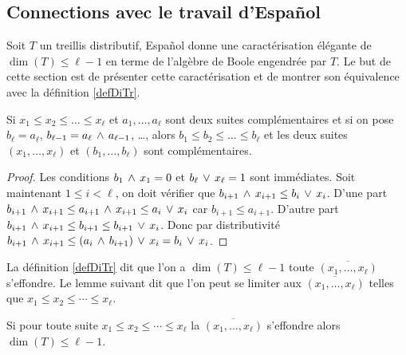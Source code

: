 \subsection{Connections avec le travail d'Espa\~nol}
\label{subsubsecEspanol}

 Soit $T$ un treillis distributif,
 Espa\~nol \cite{esp} donne une caractérisation élégante de
$\dim(T)\leq {\ell}-1$ en terme de l'algèbre de Boole
engendrée par $T$. Le but de cette section est de
présenter cette caractérisation et de montrer
son équivalence avec la définition \ref{defDiTr}.

\begin{lemma}\label{lattice3}
Si $x_1\leq x_2\leq \dots\leq x_\ell$ et $a_1,\dots,a_\ell$ sont deux suites complémentaires
et si on pose $b_\ell = a_\ell$, $b_{\ell-1}=a_\ell\,\wedge\, a_{\ell-1}$, \dots, alors $b_1\leq b_2\leq \dots\leq b_\ell$ et les deux suites $(x_1,\dots,x_\ell)$ et $(b_1,\dots,b_\ell)$ sont complémentaires. 
\end{lemma}
%
\begin{proof} Les conditions  $b_1\,\wedge\, x_1= 0$ et $b_\ell\,\vee\, x_\ell=1$ sont immédiates. Soit maintenant $1\leq i<\ell$, on doit vérifier que $b_{i+1}\,\wedge\, x_{i+1}\leq b_i\,\vee\, x_i$. D'une part $b_{i+1}\,\wedge\, x_{i+1}\leq a_{i+1}\,\wedge\, x_{i+1}\leq a_i\,\vee\, x_i$ car $b_{i+1}\leq a_{i+1}$. D'autre part 
$b_{i+1}\,\wedge\, x_{i+1}\leq b_{i+1} \leq b_{i+1}\,\vee\, x_i$. Donc par distributivité  $b_{i+1}\,\wedge\, x_{i+1}\leq (a_i\,\wedge\, b_{i+1})\,\vee\, x_i=b_i\,\vee\, x_i$.
\end{proof}
%



La définition \ref{defDiTr} dit
que l'on a $\dim(T)\leq \ell-1$ \ssi
toute \proel $\overline{(x_1,\dots,x_{\ell})}$ s'effondre.
Le lemme suivant dit que l'on peut se limiter aux
 \proels $\overline{(x_1,\dots,x_{\ell})}$ telles
que  $x_1\leq x_2\leq\cdots\leq x_{\ell}$.

\begin{lemma}\label{lemEspanol}
Si pour toute suite $x_1\leq x_2\leq\cdots\leq x_{\ell}$
la  \proel $\overline{(x_1,\dots,x_{\ell})}$ s'effondre
alors $\dim(T)\leq \ell-1$.
\end{lemma}

